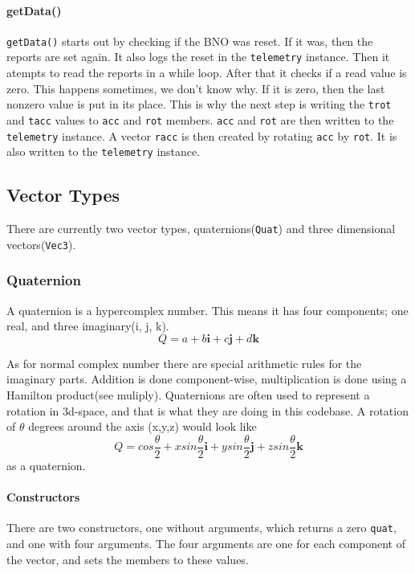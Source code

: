 \documentclass{article}
\begin{document}
\paragraph*{getData()}
\verb|getData()| starts out by checking if the BNO was reset. If it was, then the reports are set again. It also logs the reset in the \verb|telemetry| instance. Then it atempts to read the 
reports in a while loop. After that it checks if a read value is zero. This happens sometimes, we don't know why. If it is zero, then the last nonzero value is put in its place.
This is why the next step is writing the \verb|trot| and \verb|tacc| values to \verb|acc| and \verb|rot| members. \verb|acc| and \verb|rot| are then written to the \verb|telemetry| instance.
A vector \verb|racc| is then created by rotating \verb|acc| by \verb|rot|. It is also written to the \verb|telemetry| instance.

\subsection{Vector Types}
There are currently two vector types, quaternions(\verb|Quat|) and three dimensional vectors(\verb|Vec3|).


\subsubsection*{Quaternion}
A quaternion is a hypercomplex number. This means it has four components; one real, and three imaginary(i, j, k).
\begin{equation}
	Q = a + b\mathbf{i} + c\mathbf{j} + d\mathbf{k}
\end{equation}

As for normal complex number there are special arithmetic rules for the imaginary parts. Addition is done component-wise, multiplication is done using a
Hamilton product(see muliply). Quaternions are often used to represent a rotation in 3d-space, and that is what they are doing in this codebase. A rotation of $\theta$ degrees around
the axis (x,y,z) would look like
\begin{equation}
	Q=cos\frac{\theta}{2} + xsin\frac{\theta}{2}\mathbf{i} + ysin\frac{\theta}{2}\mathbf{j} + zsin\frac{\theta}{2}\mathbf{k}
\end{equation}
as a quaternion.

\paragraph*{Constructors}
There are two constructors, one without arguments, which returns a zero \verb|quat|, and one with four arguments. The four arguments are one for each component of the vector,
and sets the members to these values.
\end{document}
